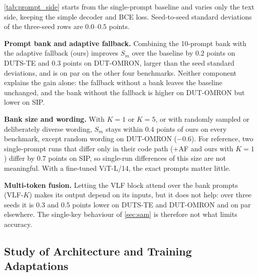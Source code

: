 \begin{revpar}
\cref{tab:prompt_side} starts from the single-prompt baseline and varies only the
text side, keeping the simple decoder and BCE loss. Seed-to-seed standard
deviations of the three-seed rows are $0.0$--$0.5$ points.

\noindent\textbf{Prompt bank and adaptive fallback.} Combining the 10-prompt bank
with the adaptive fallback (ours) improves $S_m$ over the baseline by $0.2$ points
on DUTS-TE and $0.3$ points on DUT-OMRON, larger than the seed standard deviations,
and is on par
on the other four benchmarks. Neither component explains the gain alone: the
fallback without a bank leaves the baseline unchanged, and the bank without the
fallback is higher on DUT-OMRON but lower on SIP.

\noindent\textbf{Bank size and wording.} With $K{=}1$ or $K{=}5$, or with randomly
sampled or deliberately diverse wording, $S_m$ stays within $0.4$ points of ours on
every benchmark, except random wording on DUT-OMRON ($-0.6$). For reference, two single-prompt runs that differ only in their
code path ($+$AF and ours with $K{=}1$) differ by $0.7$ points on SIP, so
single-run differences of this size are not meaningful. With a fine-tuned
ViT-L/14, the exact prompts matter little.

\noindent\textbf{Multi-token fusion.} Letting the VLF block attend over the bank
prompts (VLF-$K$) makes its output depend on its inputs, but it does not help: over
three seeds it is $0.3$ and $0.5$ points lower on DUTS-TE and DUT-OMRON and on par
elsewhere. The single-key behaviour of \cref{sec:sam} is therefore not what limits
accuracy.
\end{revpar}

\subsection{Study of Architecture and Training Adaptations}
\label{sec:study_arch}



